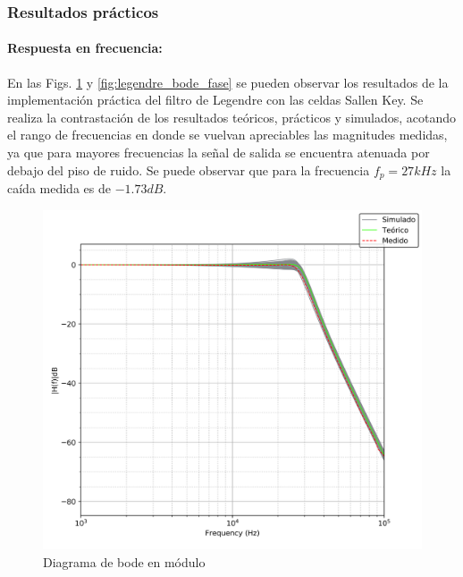 \subsubsection{Resultados pr\'acticos}

\paragraph{Respuesta en frecuencia:} En las Figs. \ref{fig:legendre_bode_modulo} y \ref{fig:legendre_bode_fase} se pueden observar los resultados de la implementaci\'on
pr\'actica del filtro de Legendre con las celdas Sallen Key. Se realiza la contrastaci\'on de los resultados te\'oricos, pr\'acticos y simulados, acotando el rango de frecuencias
en donde se vuelvan apreciables las magnitudes medidas, ya que para mayores frecuencias la se\~nal de salida se encuentra atenuada por debajo del piso de ruido. Se puede observar que para
la frecuencia $f_p = 27kHz$ la ca\'ida medida es de $-1.73dB$.

\begin{figure}[H]
    \centering
    \includegraphics[scale=0.7]{../EJ1/Recursos/legendre_bode_modulo.png}
    \caption{Diagrama de bode en m\'odulo}
    \label{fig:legendre_bode_modulo}
\end{figure}

